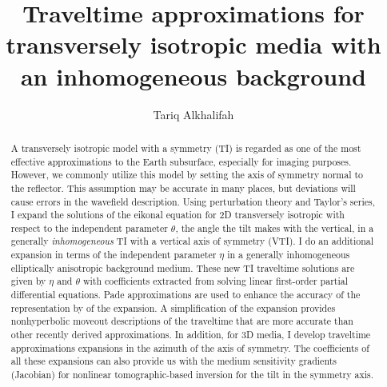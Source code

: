 



\def\beq{\begin{equation}}
\def\eeq{\end{equation}}
\def\beqa{\begin{eqnarray}}
\def\eeqa{\end{eqnarray}}

\title{Traveltime approximations for transversely isotropic media with an inhomogeneous background}


\author{Tariq Alkhalifah}


\begin{abstract}

A transversely isotropic model with a   symmetry 
(TI) is regarded as one of the most effective 
approximations to the Earth subsurface, especially for imaging
purposes. However, we commonly utilize
 this model  by setting the axis of symmetry normal to  the reflector. 
This assumption may be accurate in many places,  but deviations 
will cause errors in the wavefield description. Using perturbation theory and Taylor's series, 
I expand the solutions of the eikonal equation for  2D transversely isotropic
  with respect to the independent parameter $\theta$, the angle the
 tilt 
makes with the vertical, in a generally {\emph{inhomogeneous}} TI  with
a vertical axis of symmetry (VTI). I do an additional expansion 
 in terms of the independent 
 parameter $\eta$ in a generally inhomogeneous elliptically
anisotropic background medium. These new TI traveltime solutions are
given by   $\eta$ and $\theta$ 
with coefficients  extracted from solving linear first-order partial differential 
equations.  Pade approximations are used to enhance the accuracy of
the representation by   of the expansion.
A  simplification of the expansion  provides  
nonhyperbolic moveout descriptions of the traveltime   
that 
are more accurate than other recently derived approximations.
 In addition, for 3D media, I develop traveltime approximations   expansions in the azimuth of the axis of symmetry. The
 coefficients of all
 these expansions can also  provide us with the medium sensitivity
 gradients (Jacobian) for nonlinear tomographic-based inversion for  the tilt in the symmetry axis.


\end{abstract}
